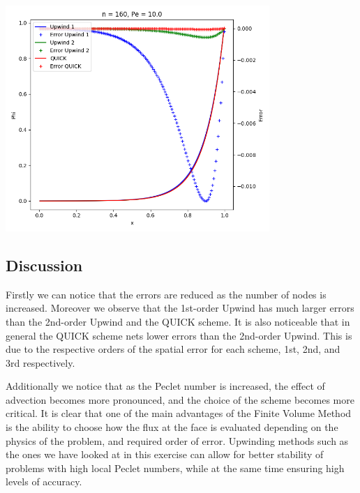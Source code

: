 \documentclass[11pt]{article}
\begin{document}
\begin{center}
\includegraphics[width=10cm]{./figures/n160pe10.png}
\end{center}

\subsection{Discussion}
\label{sec:orgdac6ee5}
Firstly we can notice that the errors are reduced as the number of nodes is increased. Moreover we observe that the 1st-order Upwind has much larger errors than the 2nd-order Upwind and the QUICK scheme. It is also noticeable that in general the QUICK scheme nets lower errors than the 2nd-order Upwind. This is due to the respective orders of the spatial error for each scheme, 1st, 2nd, and 3rd respectively. 

Additionally we notice that as the Peclet number is increased, the effect of advection becomes more pronounced, and the choice of the scheme becomes more critical. It is clear that one of the main advantages of the Finite Volume Method is the ability to choose how the flux at the face is evaluated depending on the physics of the problem, and required order of error. Upwinding methods such as the ones we have looked at in this exercise can allow for better stability of problems with high local Peclet numbers, while at the same time ensuring high levels of accuracy.  


\newpage
\end{document}
